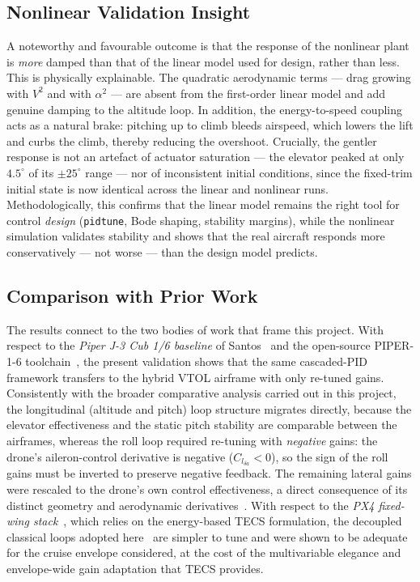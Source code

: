 \documentclass{ieeeaccess}
\begin{document}
\subsection{Nonlinear Validation Insight}

A noteworthy and favourable outcome is that the response of the nonlinear plant is \emph{more} damped than that of the linear model used for design, rather than less. This is physically explainable. The quadratic aerodynamic terms --- drag growing with $V^2$ and with $\alpha^2$ --- are absent from the first-order linear model and add genuine damping to the altitude loop. In addition, the energy-to-speed coupling acts as a natural brake: pitching up to climb bleeds airspeed, which lowers the lift and curbs the climb, thereby reducing the overshoot. Crucially, the gentler response is not an artefact of actuator saturation --- the elevator peaked at only $4.5^\circ$ of its $\pm 25^\circ$ range --- nor of inconsistent initial conditions, since the fixed-trim initial state is now identical across the linear and nonlinear runs. Methodologically, this confirms that the linear model remains the right tool for control \emph{design} (\texttt{pidtune}, Bode shaping, stability margins), while the nonlinear simulation validates stability and shows that the real aircraft responds more conservatively --- not worse --- than the design model predicts.

\subsection{Comparison with Prior Work}

The results connect to the two bodies of work that frame this project. With respect to the \textit{Piper J-3 Cub 1/6 baseline} of Santos~\cite{santos2018projeto} and the open-source PIPER-1-6 toolchain~\cite{martins2025piper}, the present validation shows that the same cascaded-PID framework transfers to the hybrid VTOL airframe with only re-tuned gains. Consistently with the broader comparative analysis carried out in this project, the longitudinal (altitude and pitch) loop structure migrates directly, because the elevator effectiveness and the static pitch stability are comparable between the airframes, whereas the roll loop required re-tuning with \emph{negative} gains: the drone's aileron-control derivative is negative ($C_{l_{\delta a}} < 0$), so the sign of the roll gains must be inverted to preserve negative feedback. The remaining lateral gains were rescaled to the drone's own control effectiveness, a direct consequence of its distinct geometry and aerodynamic derivatives~\cite{saeed2018survey,theys2016influence}. With respect to the \textit{PX4 fixed-wing stack}~\cite{meier2015px4,px4dev2025}, which relies on the energy-based TECS formulation, the decoupled classical loops adopted here~\cite{stevens2016aircraft} are simpler to tune and were shown to be adequate for the cruise envelope considered, at the cost of the multivariable elegance and envelope-wide gain adaptation that TECS provides.
\end{document}
